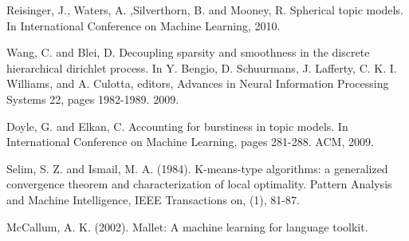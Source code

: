\documentclass[conference]{IEEEtran}
\begin{document}
\begin{thebibliography}{1}
Reisinger, J., Waters, A. ,Silverthorn, B. and Mooney, R. Spherical topic models. In International Conference on Machine Learning, 2010.

Wang, C. and Blei, D. Decoupling sparsity and smoothness in the discrete hierarchical dirichlet process. In Y. Bengio, D. Schuurmans, J. Lafferty, C. K. I. Williams, and A. Culotta, editors, Advances in Neural Information Processing Systems 22, pages 1982-1989. 2009.

Doyle, G. and Elkan, C. Accounting for burstiness in topic models. In International Conference on Machine Learning, pages 281-288. ACM, 2009.

Selim, S. Z. and Ismail, M. A. (1984). K-means-type algorithms: a generalized convergence theorem and characterization of local optimality. Pattern Analysis and Machine Intelligence, IEEE Transactions on, (1), 81-87.


McCallum, A. K. (2002). Mallet: A machine learning for language toolkit.

\end{thebibliography}




\end{document}

